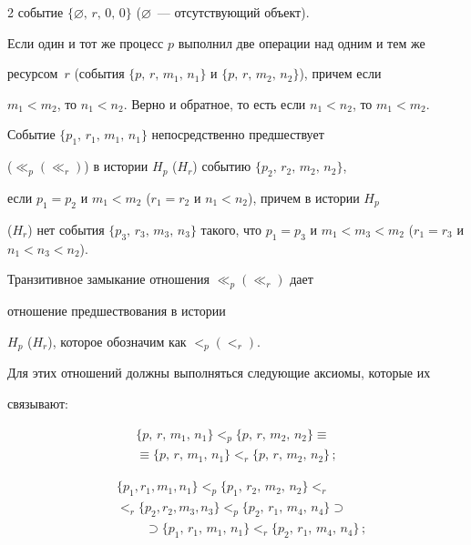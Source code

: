 \begin{multicols}{2}
событие $\{\varnothing ,\, r,\,0,\,0\}$ ($\varnothing$~--- отсутствующий объект).



Если один и тот же процесс $p$ выполнил две операции над одним и тем же

ресурсом~$r$ (события  $\{p,\,r,\,m_1,\,n_1\}$ и $\{p,\,r,\,m_2,\,n_2\}$), причем если

$m_1 < m_2$, то $n_1 < n_2$. Верно и обратное, то есть если $n_1 < n_2$, то $m_1 <

m_2$.



Событие $\{p_1,\,r_1,\,m_1,\,n_1\}$ непосредственно предшествует

($\ll_p (\ll_r)$) в истории $H_p$ ($H_r$) событию $\{p_2,\,r_2,\,m_2,\,n_2\}$,

если $p_1 = p_2$ и $m_1 < m_2$ ($r_1 = r_2$ и $n_1 < n_2$), причем в истории $H_p$

($H_r$) нет события $\{p_3,\,r_3,\,m_3,\,n_3\}$ такого, что $p_1 = p_3$ и $m_1 < m_3

< m_2$ ($r_1 = r_3$ и $n_1 < n_3 < n_2$).



Транзитивное замыкание отношения $\ll_p (\ll_r)$ дает

отношение предшествования в истории

 $H_p$ ($H_r$), которое обозначим как $<_p (<_r)$.

Для этих отношений должны выполняться следующие аксиомы, которые их

связывают:

\begin{multline*}

\{ p,\,r,\,m_1,\,n_1 \} <_p \{ p,\,r,\,m_2,\,n_2 \} \equiv\\

\equiv \{ p,\,r,\,m_1,\,n_1 \} <_r  \{ p,\,r,\,m_2,\,n_2\}\,;

\end{multline*}

\vspace*{-18pt}

\begin{align*}

&\{p_1, r_1, m_1, n_1\} <_p \{ p_1,\,r_2,\,m_2,\,n_2 \} <_r\\

&<_r \{p_2, r_2, m_3, n_3 \} <_p  \{ p_2,\,r_1,\,m_4,\,n_4\} \supset\\

&\ \ \ \ \ \ \ \ \ \ \supset \{p_1,\,r_1,\,m_1,\,n_1\} <_r \{p_2,\,r_1,\,m_4,\,n_4\}\,;


\end{align*}
\end{multicols}
